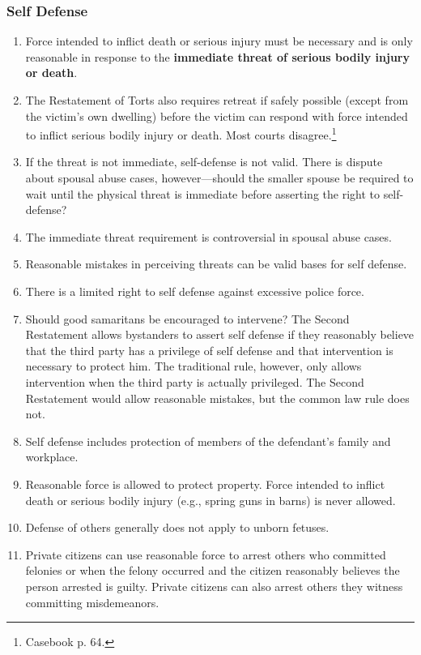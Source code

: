 \subsubsection{Self Defense}

\begin{enumerate}
    \item Force intended to inflict death or serious injury must be necessary 
    and is only reasonable in response to the \textbf{immediate threat of 
    serious bodily injury or death}.
    \item The Restatement of Torts also requires retreat if safely possible 
    (except from the victim's own dwelling) before the victim can respond with 
    force intended to inflict serious bodily injury or death. Most courts 
    disagree.\footnote{Casebook p. 64.}
    \item If the threat is not immediate, self-defense is not valid. There is 
    dispute about spousal abuse cases, however---should the smaller spouse be 
    required to wait until the physical threat is immediate before asserting 
    the right to self-defense?
    \item The immediate threat requirement is controversial in spousal abuse 
    cases.
    \item Reasonable mistakes in perceiving threats can be valid bases for 
    self defense.
    \item There is a limited right to self defense against excessive police 
    force.
    \item Should good samaritans be encouraged to intervene? The Second 
    Restatement allows bystanders to assert self defense if they reasonably 
    believe that the third party has a privilege of self defense and that 
    intervention is necessary to protect him. The traditional rule, however, 
    only allows intervention when the third party is actually privileged. The 
    Second Restatement would allow reasonable mistakes, but the common law 
    rule does not.
    \item Self defense includes protection of members of the defendant's 
    family and workplace.
    \item Reasonable force is allowed to protect property. Force intended to 
    inflict death or serious bodily injury (e.g., spring guns in barns) is 
    never allowed.
    \item Defense of others generally does not apply to unborn fetuses.
    \item Private citizens can use reasonable force to arrest others who 
    committed felonies or when the felony occurred and the citizen reasonably 
    believes the person arrested is guilty. Private citizens can also arrest 
    others they witness committing misdemeanors.
\end{enumerate}

